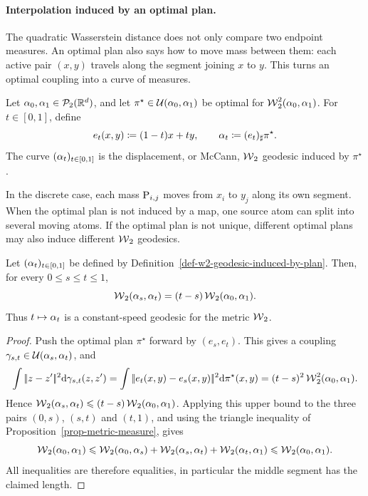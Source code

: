 \paragraph{Interpolation induced by an optimal plan.}
\label{sec-kantorovich-plan-interpolation}

The quadratic Wasserstein distance does not only compare two endpoint measures. An optimal plan also says how to move mass between them: each active pair $(x,y)$ travels along the segment joining $x$ to $y$. This turns an optimal coupling into a curve of measures.

\begin{defn}\label{def-w2-geodesic-induced-by-plan}
	Let $\al_0,\al_1\in\Pp_2(\RR^d)$, and let $\pi^\star\in\Couplings(\al_0,\al_1)$ be optimal for $\Wass_2^2(\al_0,\al_1)$. For $t\in[0,1]$, define
	\[
		e_t(x,y)\eqdef(1-t)x+t y,
		\qquad
		\al_t\eqdef(e_t)_\sharp\pi^\star.
	\]
	The curve $(\al_t)_{t\in[0,1]}$ is the displacement, or McCann, $\Wass_2$ geodesic induced by $\pi^\star$.
\end{defn}
In the discrete case, each mass $\P_{i,j}$ moves from $x_i$ to $y_j$ along its own segment. When the optimal plan is not induced by a map, one source atom can split into several moving atoms. If the optimal plan is not unique, different optimal plans may also induce different $\Wass_2$ geodesics.

\begin{prop}\label{prop-plan-interpolation-w2-geodesic}
	Let $(\al_t)_{t\in[0,1]}$ be defined by Definition~\ref{def-w2-geodesic-induced-by-plan}. Then, for every $0\leq s\leq t\leq1$,
	\[
		\Wass_2(\al_s,\al_t)
		=
		(t-s)\Wass_2(\al_0,\al_1).
	\]
	Thus $t\mapsto\al_t$ is a constant-speed geodesic for the metric $\Wass_2$.
\end{prop}
\begin{proof}
	Push the optimal plan $\pi^\star$ forward by $(e_s,e_t)$. This gives a coupling $\gamma_{s,t}\in\Couplings(\al_s,\al_t)$, and
	\[
		\int \norm{z-z'}^2\d\gamma_{s,t}(z,z')
		=
		\int \norm{e_t(x,y)-e_s(x,y)}^2\d\pi^\star(x,y)
		=
		(t-s)^2\Wass_2^2(\al_0,\al_1).
	\]
	Hence $\Wass_2(\al_s,\al_t)\leq(t-s)\Wass_2(\al_0,\al_1)$. Applying this upper bound to the three pairs $(0,s)$, $(s,t)$ and $(t,1)$, and using the triangle inequality of Proposition~\ref{prop-metric-measure}, gives
	\[
		\Wass_2(\al_0,\al_1)
		\leq
		\Wass_2(\al_0,\al_s)+\Wass_2(\al_s,\al_t)+\Wass_2(\al_t,\al_1)
		\leq
		\Wass_2(\al_0,\al_1).
	\]
	All inequalities are therefore equalities, in particular the middle segment has the claimed length.
\end{proof}

